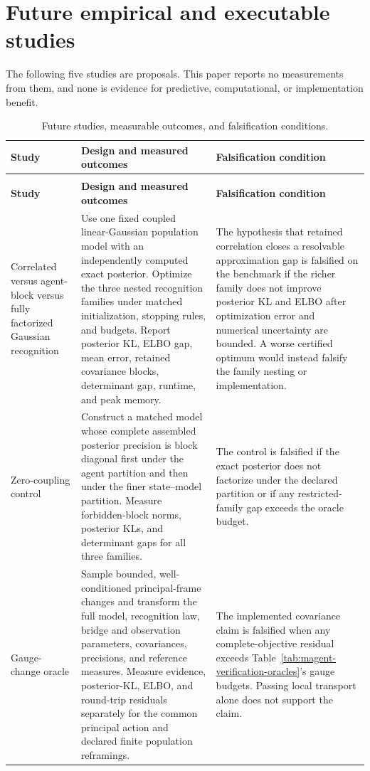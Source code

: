 \section{Future empirical and executable studies}

The following five studies are proposals. This paper reports no measurements from them, and none is evidence for predictive, computational, or implementation benefit.

\small
\begin{longtable}{>{\raggedright\arraybackslash}p{}>{\raggedright\arraybackslash}p{}>{\raggedright\arraybackslash}p{}}
\caption{Future studies, measurable outcomes, and falsification conditions.}
\label{tab:magent-future-studies}\\
\toprule
\textbf{Study} & \textbf{Design and measured outcomes} & \textbf{Falsification condition} \\
\midrule
\endfirsthead
\multicolumn{3}{l}{\textit{Table \thetable\ continued}}\\
\toprule
\textbf{Study} & \textbf{Design and measured outcomes} & \textbf{Falsification condition} \\
\midrule
\endhead
\bottomrule
\endlastfoot
Correlated versus agent-block versus fully factorized Gaussian recognition & Use one fixed coupled linear-Gaussian population model with an independently computed exact posterior. Optimize the three nested recognition families under matched initialization, stopping rules, and budgets. Report posterior KL, ELBO gap, mean error, retained covariance blocks, determinant gap, runtime, and peak memory. & The hypothesis that retained correlation closes a resolvable approximation gap is falsified on the benchmark if the richer family does not improve posterior KL and ELBO after optimization error and numerical uncertainty are bounded. A worse certified optimum would instead falsify the family nesting or implementation. \\
\addlinespace
Zero-coupling control & Construct a matched model whose complete assembled posterior precision is block diagonal first under the agent partition and then under the finer state--model partition. Measure forbidden-block norms, posterior KLs, and determinant gaps for all three families. & The control is falsified if the exact posterior does not factorize under the declared partition or if any restricted-family gap exceeds the oracle budget. \\
\addlinespace
Gauge-change oracle & Sample bounded, well-conditioned principal-frame changes and transform the full model, recognition law, bridge and observation parameters, covariances, precisions, and reference measures. Measure evidence, posterior-KL, ELBO, and round-trip residuals separately for the common principal action and declared finite population reframings. & The implemented covariance claim is falsified when any complete-objective residual exceeds Table~\ref{tab:magent-verification-oracles}'s gauge budgets. Passing local transport alone does not support the claim. \\

\end{longtable}
